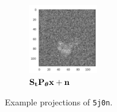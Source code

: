 \begin{figure}[ht!]
\begin{minipage}[b]{0.45\linewidth}
        \hfill
        \begin{subfigure}[b]{0.49\linewidth}
            \centering
            \includegraphics[height=3cm]{figures/5j0n_noise16_translated}
            \caption{$\mathbf{S}_{\mathbf{t}} \mathbf{P}_{{\boldsymbol{\theta}}} \mathbf{x} + \mathbf{n}$}
        \end{subfigure}
        \caption{%
            Example projections of \texttt{5j0n}.
        }\label{fig:different-projections}
    \end{minipage}
\end{figure}

